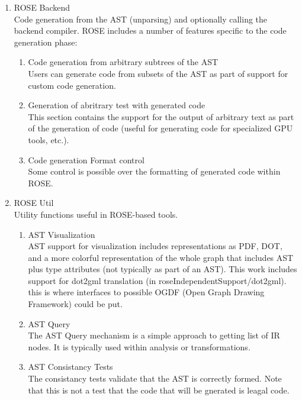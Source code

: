 \begin{enumerate}
   \item ROSE Backend \\
      Code generation from the AST (unparsing) and optionally calling the backend
      compiler.  ROSE includes a number of features specific to the code generation phase: 
   \begin{enumerate}
      \item Code generation from arbitrary subtrees of the AST \\
         Users can generate code from subsets of the AST as part of support for custom
         code generation.
      \item Generation of abritrary test with generated code \\
         This section contains the support for the output of arbitrary text as part of the
         generation of code (useful for generating code for specialized GPU tools, etc.).
      \item Code generation Format control \\
         Some control is possible over the formatting of generated code within ROSE.
   \end{enumerate}


   \item ROSE Util \\
      Utility functions useful in ROSE-based tools.
   \begin{enumerate}
      \item AST Visualization \\
         AST support for visualization includes representations as PDF, DOT, and
         a more colorful representation of the whole graph that includes AST plus 
         type attributes (not typically as part of an AST). This work includes
         support for dot2gml translation (in roseIndependentSupport/dot2gml).
         this is where interfaces to possible OGDF (Open Graph Drawing Framework)
         could be put.

      \item AST Query \\
         The AST Query mechanism is a simple approach to getting list of IR nodes.
         It is typically used within analysis or transformations.

      \item AST Consistancy Tests \\
         The consistancy tests validate that the AST is correctly formed. Note that this
         is not a test that the code that will be gnerated is leagal code.


\end{enumerate}
\end{enumerate}
